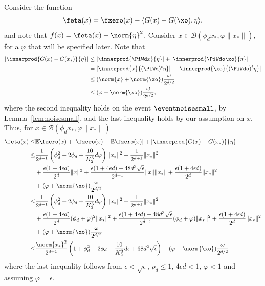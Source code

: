 Consider the function
\[
\feta(x) = \fzero(x) - \langle G(x) - G(\xo), \eta \rangle,
\]
and note that $f(x) = \feta(x) - \norm{\eta}^2$. 
Consider $x \in \mathcal{B}(\phi_d x_*, \varphi  \|x_*\|)$, for a $\varphi$ that will be specified later. 
Note that
\begin{align*}
\left|\innerprod{G(x) - G(x_\ast)}{\eta}\right|
&\leq
|\innerprod{\PiWd x}{\eta}|
+
|\innerprod{\PiWdo \xo}{\eta}| \\
&=
|\innerprod{x}{(\PiWd)^t\eta}|
+
|\innerprod{\xo}{(\PiWdo)^t\eta}| \\
&\leq (\norm{x} + \norm{\xo}) \frac{\omega}{2^{d/2}}\\
&\leq (\varphi + \norm{\xo}) \frac{\omega}{2^{d/2}},
\end{align*}
where the second inequality holds on the event $\eventnoisesmall$, by Lemma~\ref{lem:noisesmall}, and the last inequality holds by our assumption on $x$.
Thus, for $x \in \mathcal{B}(\phi_d x_*, \varphi  \|x_*\|)$
\begin{align}
\feta(x) 
\leq& 
\mathbb{E}\fzero(x) + |\fzero(x) - \mathbb{E}\fzero(x)| + 
\left|\innerprod{G(x) - G(x_\ast)}{\eta}\right|
\nonumber \\
%
\leq& 
\frac{1}{2^{d+1}} \left( \phi_d^2 - 2 \phi_d + \frac{10}{K_2^3} d \varphi \right) \|x_*\|^2 + \frac{1}{2^{d+1}} \|x_*\|^2 \nonumber \\
&+ 
\frac{\epsilon (1 + 4 \epsilon d)}{2^d} \|x\|^2 + \frac{\epsilon(1 + 4 \epsilon d) + 48 d^3 \sqrt{\epsilon}}{2^{d+1}} \|x\| \|x_*\| + \frac{\epsilon (1 + 4 \epsilon d)}{2^d} \|x_*\|^2 \nonumber \\
&+ (\varphi + \norm{\xo}) \frac{\omega}{2^{d/2}} \nonumber \\
%
\leq& 
\frac{1}{2^{d+1}} \left( \phi_d^2 - 2 \phi_d + \frac{10}{K_2^3} d \varphi \right) \|x_*\|^2 + \frac{1}{2^{d+1}} \|x_*\|^2 \nonumber \\
&+
\frac{\epsilon (1 + 4 \epsilon d)}{2^d} (\phi_d + \varphi)^2 \|x_*\|^2 + \frac{\epsilon(1 + 4 \epsilon d) + 48 d^3 \sqrt{\epsilon}}{2^{d+1}} (\phi_d + \varphi)\|x_*\|^2 + \frac{\epsilon (1 + 4 \epsilon d)}{2^d} \|x_*\|^2  \nonumber \\
&+ 
(\varphi + \norm{\xo}) \frac{\omega}{2^{d/2}} \nonumber \\%
%
\leq& 
\frac{ \norm{x_*}^2 }{2^{d+1}} 
\left( 
1+
\phi_d^2 - 2 \phi_d + \frac{10}{K_2^3} d \epsilon
+
68 d^2 \sqrt{\epsilon}
\right)
+ 
(\varphi + \norm{\xo}) \frac{\omega}{2^{d/2}} \label{GA:e42}
\end{align}
where the last inequality follows from $\epsilon < \sqrt{\epsilon}$, $\rho_d \leq 1$, $4 \epsilon d < 1$, $\varphi < 1$ and assuming $\varphi = \epsilon$. 

